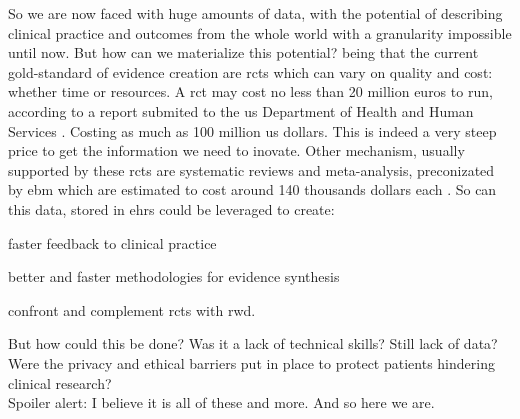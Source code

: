 So we are now faced with huge amounts of data, with the potential of describing clinical practice and outcomes from the whole world with a granularity impossible until now. But how can we materialize this potential?
being that the current gold-standard of evidence creation are \acp{rct} which can vary on quality and cost: whether time or resources. A \ac{rct} may cost no less than 20 million euros to run, according to a report submited to the \ac{us} Department of Health and Human Services \cite{sertkayaaylinEXAMINATIONCLINICALTRIAL2014}. Costing as much as 100 million \ac{us} dollars. This is indeed a very steep price to get the information we need to inovate.
Other mechanism, usually supported by these \acp{rct} are systematic reviews and meta-analysis, preconizated by \ac{ebm} which are estimated to cost around 140 thousands dollars each \cite{michelsonSignificantCostSystematic2019}.
So can this data, stored in \acp{ehr} could be leveraged to create:
\begin{myitemize}
    \item faster feedback to clinical practice
    \item better and faster methodologies for evidence synthesis
    \item confront and complement \acp{rct} with \ac{rwd}.
\end{myitemize}
But how could this be done? Was it a lack of technical skills? Still lack of data? Were the privacy and ethical barriers put in place to protect patients hindering clinical research? \\
Spoiler alert: I believe it is all of these and more. And so here we are.



